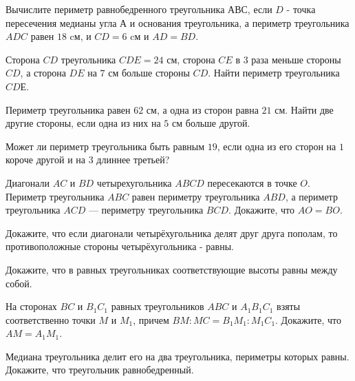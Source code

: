 \begin{class}[number=6]
	\begin{listofex}
		\item Вычислите периметр равнобедренного треугольника \(АВС\), если \(D\) - точка пересечения медианы угла \(А\) и основания треугольника, а периметр треугольника \(ADC\) равен \(18\) cм, и \(CD = 6\) cм и \(AD = BD\).
		\item Сторона \(CD\) треугольника \(CDE = 24\) см, сторона \(CE\) в \(3\) раза меньше стороны  \(CD\), а сторона \(DE\) на \(7\) см больше стороны \(CD\). Найти периметр треугольника  \(CDЕ\).
		\item Периметр треугольника равен \(62\) см, а одна из сторон равна \(21\) см. Найти две другие стороны, если одна из них на \(5\) см больше другой.
		\item Может ли периметр треугольника быть равным \(19\), если одна из его сторон на \(1\) короче другой и на \(3\) длиннее третьей?
		\item Диагонали \(AC\) и \(BD\) четырехугольника \(ABCD\) пересекаются в точке \(O\). Периметр треугольника \(ABC\) равен периметру треугольника \(ABD\), а периметр треугольника \(ACD\) --- периметру треугольника \(BCD\). Докажите, что \(AO = BO\).
		\item Докажите, что если диагонали четырёхугольника делят друг друга пополам, то противоположные стороны четырёхугольника - равны.
		\item Докажите, что в равных треугольниках соответствующие высоты равны между собой.
		\item На сторонах \(BC\) и \(B_1C_1\) равных треугольников \(ABC\) и \(A_1B_1C_1\) взяты соответственно точки \(M\) и \(M_1\), причем \(BM : MC = B_1M_1 : M_1C_1\). Докажите, что \(AM = A_1M_1\).
		\item Медиана треугольника делит его на два треугольника, периметры которых равны. Докажите, что треугольник равнобедренный.
	\end{listofex}
\end{class}
%
%
%	
